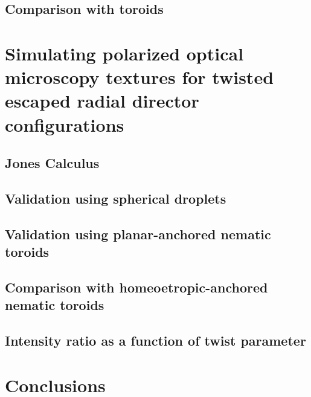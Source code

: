 \subsection{Comparison with toroids}

\section{Simulating polarized optical microscopy textures for twisted escaped radial director configurations}
\subsection{Jones Calculus}
\subsection{Validation using spherical droplets}
\subsection{Validation using planar-anchored nematic toroids}
\subsection{Comparison with homeoetropic-anchored nematic toroids}
\subsection{Intensity ratio as a function of twist parameter}

\section{Conclusions}



